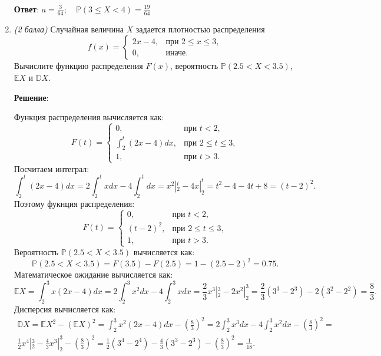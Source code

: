 \documentclass{article}
\begin{document}
\begin{enumerate}
\textbf{Ответ}:
$a = \frac{3}{64}; \quad \mathbb{P}(3\leq X<4) = \frac{19}{64}$

\item \textit{(2 балла)} Случайная величина $X$ задается плотностью распределения
$$f(x)=
\begin{cases}
   2x-4, &\text{при } 2\leq x\leq3,\\
   0, &\text{иначе}.
 \end{cases}$$
Вычислите функцию распределения $F(x)$, вероятность $\mathbb{P}(2.5<X<3.5)$, $\mathbb{E}X$ и $\mathbb{D}X$.

\textbf{Решение}:

Функция распределения вычисляется как:
\begin{equation}
    F(t) = \begin{cases}
        0, &\text{при } t < 2,\\
        \int_{2}^{t}(2x-4)dx, &\text{при } 2\leq t\leq3,\\
        1, &\text{при } t > 3.
    \end{cases}
\end{equation}
Посчитаем интеграл:
\begin{equation}
    \int_{2}^{t}(2x-4)dx = 2\int_{2}^{t}xdx - 4\int_{2}^{t}dx = x^2 |_2^t - 4 x|_2^t = t^2 - 4 - 4t + 8 = (t-2)^2.
\end{equation}
Поэтому фукнция распределения:
\begin{equation}
    F(t) = \begin{cases}
        0, &\text{при } t < 2,\\
        (t-2)^2, &\text{при } 2\leq t\leq3,\\
        1, &\text{при } t > 3.
    \end{cases}
\end{equation}
Вероятность $\mathbb{P}(2.5<X<3.5)$ вычисляется как:
\begin{equation}
    \mathbb{P}(2.5<X<3.5) = F(3.5) - F(2.5) = 1 - (2.5-2)^2 = 0.75.
\end{equation}
Математическое ожидание вычисляется как:
\begin{equation}
    \mathbb{E}X = \int_{2}^{3}x(2x-4)dx = 2\int_{2}^{3}x^2 dx - 4\int_{2}^{3}xdx = \frac{2}{3} x^3|_2^3 - 2 x^2|_2^3 = \frac{2}{3} (3^3-2^3) - 2 (3^2-2^2) = \frac{8}{3}.
\end{equation}
Дисперсия вычисляется как:
\begin{eqnarray}
    \mathbb{D}X = \mathbb{E}X^2 - (\mathbb{E}X)^2 = \int_{2}^{3}x^2(2x-4)dx - \left(\frac{8}{3}\right)^2 = 2\int_{2}^{3}x^3dx - 4\int_{2}^{3}x^2dx - \left(\frac{8}{3}\right)^2 = \\
    \frac{1}{2} x^4|_2^3 - \frac{4}{3} x^3|_2^3 - \left(\frac{8}{3}\right)^2 = \frac{1}{2} (3^4 - 2^4) - \frac{4}{3} (3^3 - 2^3) - \left(\frac{8}{3}\right)^2 = \frac{1}{18}.
\end{eqnarray}


\end{enumerate}
\end{document}
